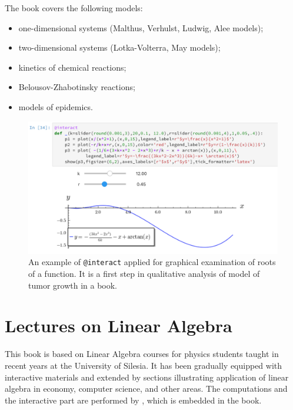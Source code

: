 \documentclass{deliverablereport}
\begin{document}
The book covers the following  models: 
 \begin{itemize}
  \item one-dimensional systems (Malthus, Verhulst, Ludwig, Alee models);
  \item two-dimensional systems (Lotka-Volterra, May models);
  \item kinetics of chemical reactions;
  \item Belousov-Zhabotinsky reactions;
  \item models of epidemics.
 \end{itemize}

\begin{figure}
\centerline{\includegraphics[width=.7\textwidth]{interact_npb.png}}
\caption{\label{fig:interact2} An example of \texttt{@interact}
  applied for graphical examination of roots of a function. It is a
  first step in qualitative analysis of model of tumor growth in a
  book.  }
\end{figure}



\section{Lectures on Linear Algebra}

This book is based on Linear Algebra courses for physics students
taught in recent years at the University of Silesia. It has been
gradually equipped with interactive materials and extended by sections
illustrating application of linear algebra in economy, computer
science, and other areas. The computations and the interactive part are
performed by \Sage, which is embedded in the book.
\end{document}
